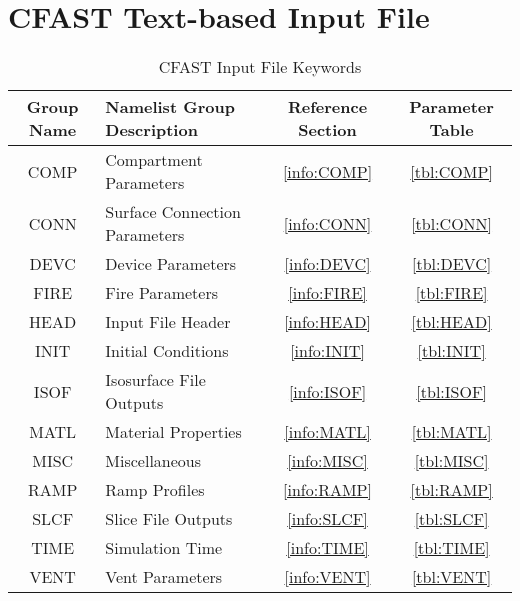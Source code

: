 \chapter{CFAST Text-based Input File}

\begin{table}[ht]
\begin{center}
\caption{CFAST Input File Keywords}
\label{tbl:namelistgroups}
\begin{tabular}{|c|l|c|c|}
\hline
Group Name  & Namelist Group Description& Reference Section & Parameter Table  \\ \hline
{\ct COMP}   & Compartment Parameters         & \ref{info:COMP} & \ref{tbl:COMP}  \\ \hline
{\ct CONN}   & Surface Connection Parameters          & \ref{info:CONN} & \ref{tbl:CONN}  \\ \hline
{\ct DEVC}    & Device Parameters          & \ref{info:DEVC} & \ref{tbl:DEVC}  \\ \hline
{\ct FIRE}     & Fire Parameters  & \ref{info:FIRE} & \ref{tbl:FIRE}  \\ \hline
{\ct HEAD}    & Input File Header            & \ref{info:HEAD} & \ref{tbl:HEAD}  \\ \hline
{\ct INIT}      & Initial Conditions            & \ref{info:INIT} & \ref{tbl:INIT}  \\ \hline
{\ct ISOF}     & Isosurface File Outputs            & \ref{info:ISOF} & \ref{tbl:ISOF}  \\ \hline
{\ct MATL}    & Material Properties           & \ref{info:MATL} & \ref{tbl:MATL}  \\ \hline
{\ct MISC}     & Miscellaneous    & \ref{info:MISC} & \ref{tbl:MISC}  \\ \hline
{\ct RAMP}    & Ramp Profiles            & \ref{info:RAMP} & \ref{tbl:RAMP}  \\ \hline
{\ct SLCF}     & Slice File Outputs       & \ref{info:SLCF} & \ref{tbl:SLCF}  \\ \hline
{\ct TIME}     & Simulation Time            & \ref{info:TIME} & \ref{tbl:TIME}  \\ \hline
{\ct VENT}     & Vent Parameters              & \ref{info:VENT} & \ref{tbl:VENT}  \\ \hline
\end{tabular}
\end{center}
\end{table}


